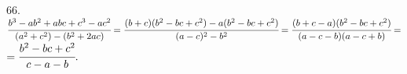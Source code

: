 66. $\cfrac{b^3-ab^2+abc+c^3-ac^2}{(a^2+c^2)-(b^2+2ac)}=\cfrac{(b+c)(b^2-bc+c^2)-a(b^2-bc+c^2)}{(a-c)^2-b^2}=
\cfrac{(b+c-a)(b^2-bc+c^2)}{(a-c-b)(a-c+b)}=$\\$=\cfrac{b^2-bc+c^2}{c-a-b}.$\\
